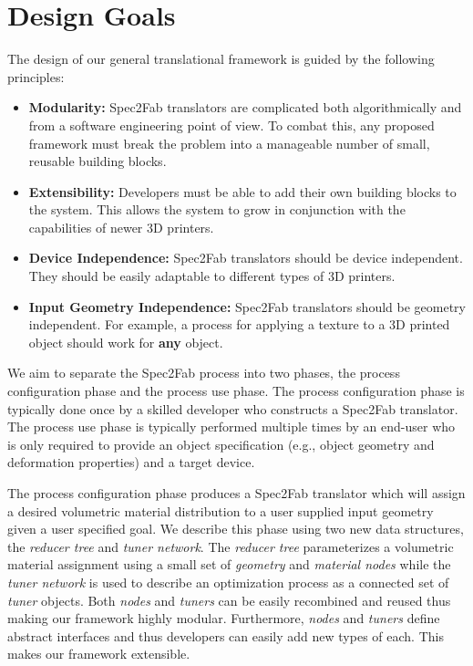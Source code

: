 \chapter{Design Goals}
\label{chap:design}
The design of our general translational framework is guided by the following principles:

\begin{itemize}

\item \textbf{Modularity:} Spec2Fab translators are complicated both algorithmically and from a software engineering point of view. To combat this, any proposed framework must break the problem into a manageable number of small, reusable building blocks. 

\item \textbf{Extensibility:} Developers must be able to add their own building blocks to the system. This allows the system to grow in conjunction with the capabilities of newer 3D printers.
\vspace{-0.25\baselineskip}

\item \textbf{Device Independence:} Spec2Fab translators should be device independent. They should be easily adaptable to different types of 3D printers.
\item \textbf{Input Geometry Independence:} Spec2Fab translators should be geometry independent. For example, a process for applying a texture to a 3D printed object should work for \textbf{any} object.
\vspace{-0.25\baselineskip}
\end{itemize}

We aim to separate the Spec2Fab process into two phases, the process configuration phase and the process use phase. The process configuration phase is typically done once by a skilled developer who  constructs a Spec2Fab translator. The process use phase is typically performed multiple times by an end-user who is only required to provide an object specification (e.g., object geometry and deformation properties) and a target device. 

	The process configuration phase produces a Spec2Fab translator which will assign a desired volumetric material distribution to a user supplied input geometry given a user specified goal. We describe this phase using two new data structures, the \emph{reducer tree} and \emph{tuner network}. The \emph{reducer tree} parameterizes a volumetric material assignment using a small set of \emph{geometry} and \emph{material nodes} while the \emph{tuner network} is used to describe an optimization process as a connected set of \emph{tuner} objects.  Both \emph{nodes} and \emph{tuners} can be easily recombined and reused thus making  our framework highly modular. Furthermore,  \emph{nodes} and \emph{tuners} define abstract interfaces and thus developers can easily add new types of each. This makes our framework extensible.
	
